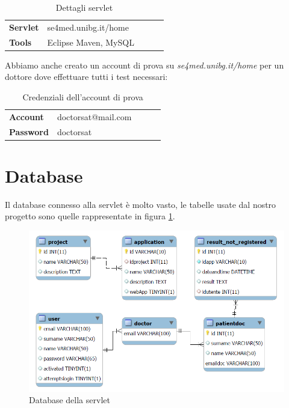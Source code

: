 \documentclass[
	corpo=12pt,
	twoside,
 	evenboxes,
	tipotesi=triennale,
    	stile=classica,
   	 greek,
]{toptesi}
\begin{document}
\begin{table}[]
\centering
\begin{tabular}{lllll}
\toprule
\textbf{Servlet} &  se4med.unibg.it/home\\
\textbf{Tools} & Eclipse Maven, MySQL\\
\bottomrule
\end{tabular}
\caption{Dettagli servlet \label{t:1}}
\end{table}

Abbiamo anche creato un account di prova su \textit{se4med.unibg.it/home} per un dottore dove effettuare tutti i test necessari:\\

\begin{table}[]
\centering
\begin{tabular}{lllll}
\toprule
\textbf{Account} &  doctorsat@mail.com\\
\textbf{Password} & doctorsat\\
\bottomrule
\end{tabular}
\caption{Credenziali dell'account di prova \label{t:1}}
\end{table}

\newpage

\section{Database}
\label{sec:database}
Il database connesso alla servlet è molto vasto, le tabelle usate dal nostro progetto sono quelle rappresentate in figura \ref{fig:database}.

\begin{figure}[H]
\centering
\includegraphics[width=0.9\columnwidth]{images/database.png}
\caption{Database della servlet}
\label{fig:database}
\end{figure}
\end{document}
